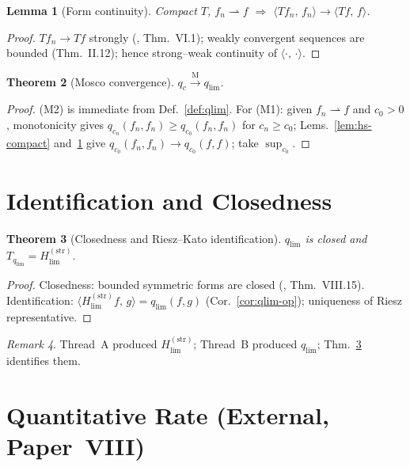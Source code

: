 \documentclass[12pt,a4paper]{amsart}
\newtheorem{theorem}{Theorem}[section]
\newtheorem{lemma}[theorem]{Lemma}
\theoremstyle{definition}
\theoremstyle{remark}
\newtheorem{remark}[theorem]{Remark}
\newcommand{\ip}[2]{\langle #1,\, #2\rangle}
\newcommand{\Hstrong}{H_{\lim}^{(\mathrm{str})}}
\newcommand{\qc}{q_c}
\newcommand{\qlim}{q_{\lim}}
\begin{document}
\begin{lemma}[Form continuity]
\label{lem:wc}
Compact $T$, $f_n\rightharpoonup f$
$\Rightarrow$
$\ip{Tf_n}{f_n}\to\ip{Tf}{f}$.
\end{lemma}
\begin{proof}
$Tf_n\to Tf$ strongly
(\cite{ReedSimon1975}, Thm.~VI.1);
weakly convergent sequences are
bounded (Thm.~II.12);
hence strong--weak continuity of
$\ip{\cdot}{\cdot}$.
\end{proof}

\begin{theorem}[Mosco convergence]
\label{thm:mosco}
$\qc\xrightarrow{\mathrm{M}}\qlim$.
\end{theorem}
\begin{proof}
(M2) is immediate from
Def.~\ref{def:qlim}.
For (M1): given $f_n\rightharpoonup f$
and $c_0>0$, monotonicity gives
$q_{c_n}(f_n,f_n)\ge q_{c_0}(f_n,f_n)$
for $c_n\ge c_0$;
Lems.~\ref{lem:hs-compact}
and~\ref{lem:wc} give
$q_{c_0}(f_n,f_n)\to q_{c_0}(f,f)$;
take $\sup_{c_0}$.
\end{proof}

\section{Identification and Closedness}
\label{sec:friedrichs}

\begin{theorem}[Closedness and
  Riesz--Kato identification]
\label{thm:friedrichs}
$\qlim$ is closed and
$T_{\qlim}=\Hstrong$.
\end{theorem}
\begin{proof}
Closedness: bounded symmetric
forms are closed
(\cite{ReedSimon1975}, Thm.~VIII.15).
Identification:
$\ip{\Hstrong f}{g}=\qlim(f,g)$
(Cor.~\ref{cor:qlim-op});
uniqueness of Riesz representative.
\end{proof}

\begin{remark}
Thread~A produced $\Hstrong$;
Thread~B produced $\qlim$;
Thm.~\ref{thm:friedrichs}
identifies them.
\end{remark}

\section{Quantitative Rate
  (External, Paper~VIII)}
\label{sec:rate}
\end{document}
